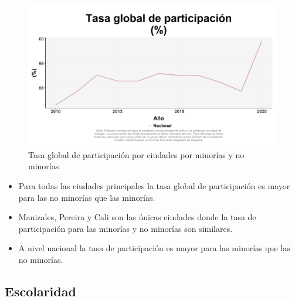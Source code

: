     \begin{figure}[H]
        \caption{Tasa global de participación por ciudades por minorías y no minorías \label{map_result_2} }
        \begin{center}
        \includegraphics[width=\textwidth,keepaspectratio]{img/var_80_trend.png}
        \end{center}
    \end{figure}
            \begin{itemize}
                \item Para todas las ciudades principales la tasa global de participación es mayor para las no minorías que las minorías.
                \item Manizales, Pereira y Cali son las únicas ciudades donde la tasa de participación para las minorías y no minorías son similares.
                \item A nivel nacional la tasa de participación es mayor para las minorías que las no minorías.
                \end{itemize}

    \subsection{Escolaridad}

